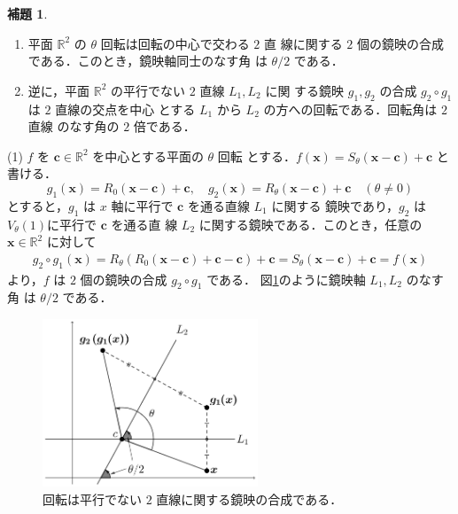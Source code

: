 \documentclass[11pt, uplatex, dvipdfmx, titlepage]{jsarticle}
\makeatletter
\renewenvironment{proof}[1][\proofname]{\par
  \pushQED{\qed}%
  \normalfont \topsep6\p@\@plus6\p@\relax
  \trivlist
  \item[\hskip\labelsep
         \bfseries
    {#1}]\ignorespaces
}{%
  \popQED\endtrivlist\@endpefalse
}
\theoremstyle{definition}
\newtheorem{lemma}{補題}[section]
\renewcommand{\proofname}{\textbf{証明}}
\makeatother
\begin{document}
\begin{lemma}\label{lem:rotaion2ref}
  \begin{enumerate}[(1)]
  \item 平面 $\mathbb{R}^2$ の $\theta$ 回転は回転の中心で交わる $2$ 直
    線に関する $2$ 個の鏡映の合成である．このとき，鏡映軸同士のなす角
    は $\theta/2$ である．

  \item 逆に，平面 $\mathbb{R}^2$ の平行でない $2$ 直線 $L_1, L_2$ に関
    する鏡映 $g_1, g_2$ の合成 $g_2 \circ g_1$ は $2$ 直線の交点を中心
    とする $L_1$ から $L_2$ の方への回転である．回転角は $2$ 直線
    のなす角の $2$ 倍である．
  \end{enumerate}
\end{lemma}

\begin{proof}
  (1) $f$ を $\bm{c} \in \mathbb{R}^2$ を中心とする平面の $\theta$ 回転
  とする．$f(\bm{x}) = S_{\theta}(\bm{x}-\bm{c})+\bm{c}$ と書ける．
  \[
    g_1(\bm{x})=R_0(\bm{x}-\bm{c})+\bm{c}, \quad g_2 (\bm{x}) = R_{\theta}(\bm{x}-\bm{c})+\bm{c}
    \quad (\theta \neq 0)
  \]
  とすると，$g_1$ は $x$ 軸に平行で $\bm{c}$ を通る直線 $L_1$ に関する
  鏡映であり，$g_2$ は $V_{\theta}(1)$に平行で $\bm{c}$ を通る直
  線 $L_2$ に関する鏡映である．このとき，任意の $\bm{x} \in
  \mathbb{R}^2$ に対して
  \begin{align*}
    g_2 \circ g_1(\bm{x}) = R_{\theta}\left( R_{0}(\bm{x}-\bm{c}) + \bm{c} - \bm{c} \right) + \bm{c}
    = S_{\theta} (\bm{x}-\bm{c}) +\bm{c} = f(\bm{x})
  \end{align*}
  より，$f$ は $2$ 個の鏡映の合成 $g_2 \circ g_1$ である．
  図\ref{fig:rotation2ref}のように鏡映軸 $L_1, L_2$ のなす角
  は $\theta/2$ である．
  \begin{figure}[h]
    \centering
    \includegraphics[height=5cm]{pictures/rotation2ref.pdf}
    \caption{回転は平行でない $2$ 直線に関する鏡映の合成である．}\label{fig:rotation2ref}
  \end{figure}


\end{proof}
\end{document}
